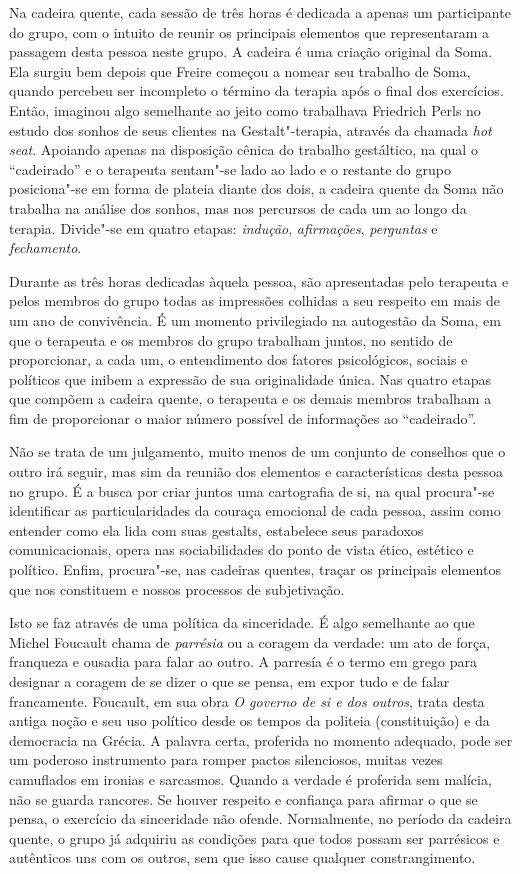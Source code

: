Na cadeira quente, cada sessão de três horas é dedicada a apenas um
participante do grupo, com o intuito de reunir os principais elementos
que representaram a passagem desta pessoa neste grupo. A cadeira é uma
criação original da Soma. Ela surgiu bem depois que Freire começou a
nomear seu trabalho de Soma, quando percebeu ser incompleto o término da
terapia após o final dos exercícios. Então, imaginou algo semelhante ao
jeito como trabalhava Friedrich Perls no estudo dos sonhos de seus
clientes na Gestalt"-terapia, através da chamada \emph{hot seat}. Apoiando
apenas na disposição cênica do trabalho gestáltico, na qual o
``cadeirado'' e o terapeuta sentam"-se lado ao lado e o restante do grupo
posiciona"-se em forma de plateia diante dos dois, a cadeira quente da
Soma não trabalha na análise dos sonhos, mas nos percursos de cada um ao
longo da terapia. Divide"-se em quatro etapas: \emph{indução},
\emph{afirmações}, \emph{perguntas} e \emph{fechamento}.

Durante as três horas dedicadas àquela pessoa, são apresentadas pelo
terapeuta e pelos membros do grupo todas as impressões colhidas a seu
respeito em mais de um ano de convivência. É um momento privilegiado na
autogestão da Soma, em que o terapeuta e os membros do grupo trabalham
juntos, no sentido de proporcionar, a cada um, o entendimento dos fatores
psicológicos, sociais e políticos que inibem a expressão de sua
originalidade única. Nas quatro etapas que compõem a cadeira quente, o
terapeuta e os demais membros trabalham a fim de proporcionar o maior
número possível de informações ao ``cadeirado''.

Não se trata de um julgamento, muito menos de um conjunto de conselhos
que o outro irá seguir, mas sim da reunião dos elementos e
características desta pessoa no grupo. É a busca por criar juntos uma
cartografia de si, na qual procura"-se identificar as particularidades da
couraça emocional de cada pessoa, assim como entender como ela lida com
suas gestalts, estabelece seus paradoxos comunicacionais, opera nas
sociabilidades do ponto de vista ético, estético e político. Enfim,
procura"-se, nas cadeiras quentes, traçar os principais elementos que nos
constituem e nossos processos de subjetivação.

Isto se faz através de uma política da sinceridade. É algo semelhante ao
que Michel Foucault chama de \emph{parrésia} ou a coragem da verdade: um
ato de força, franqueza e ousadia para falar ao outro. A parresía é o
termo em grego para designar a coragem de se dizer o que se pensa, em
expor tudo e de falar francamente. Foucault, em sua obra \emph{O governo
de si e dos outros}, trata desta antiga noção e seu uso político desde
os tempos da politeia (constituição) e da democracia na Grécia. A
palavra certa, proferida no momento adequado, pode ser um poderoso
instrumento para romper pactos silenciosos, muitas vezes camuflados em
ironias e sarcasmos. Quando a verdade é proferida sem malícia, não se
guarda rancores. Se houver respeito e confiança para afirmar o que se
pensa, o exercício da sinceridade não ofende. Normalmente, no período da
cadeira quente, o grupo já adquiriu as condições para que todos possam
ser parrésicos e autênticos uns com os outros, sem que isso cause
qualquer constrangimento.

